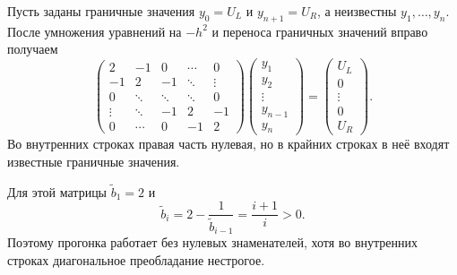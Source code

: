 \documentclass[../final.tex]{subfiles}
\begin{document}
Пусть заданы граничные значения $y_0=U_L$ и $y_{n+1}=U_R$,
а неизвестны $y_1,\ldots,y_n$. После умножения уравнений на $-h^2$
и переноса граничных значений вправо получаем
\begin{equation*}
    \begin{pmatrix}
        2&-1&0&\cdots&0\\
        -1&2&-1&\ddots&\vdots\\
        0&\ddots&\ddots&\ddots&0\\
        \vdots&\ddots&-1&2&-1\\
        0&\cdots&0&-1&2
    \end{pmatrix}
    \begin{pmatrix}y_1\\y_2\\\vdots\\y_{n-1}\\y_n\end{pmatrix}
    =\begin{pmatrix}U_L\\0\\\vdots\\0\\U_R\end{pmatrix}.
\end{equation*}
Во внутренних строках правая часть нулевая, но в крайних строках
в неё входят известные граничные значения.

Для этой матрицы $\widetilde b_1=2$ и
\begin{equation*}
    \widetilde b_i=2-\frac1{\widetilde b_{i-1}}
    =\frac{i+1}{i}>0.
\end{equation*}
Поэтому прогонка работает без нулевых знаменателей, хотя во внутренних
строках диагональное преобладание нестрогое.
\end{document}
